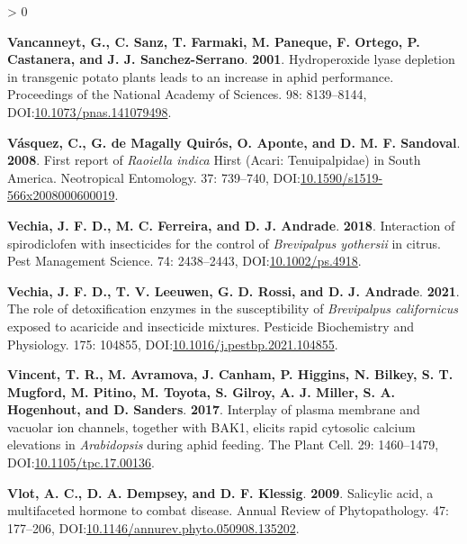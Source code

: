 \documentclass{ufdissertation}[overrideChapters] %
\newlength{\cslhangindent}
\newenvironment{CSLReferences}[2] %
 {%
  \setlength{\parindent}{0pt}
  \ifodd #1 \everypar{\setlength{\hangindent}{\cslhangindent}}\ignorespaces\fi
  \ifnum #2 > 0
  \setlength{\parskip}{#2\baselineskip}
  \fi
 }%
 {}
\begin{document}
{\begin{CSLReferences}{1}{1}
\leavevmode{}%
\textbf{Vancanneyt, G., C. Sanz, T. Farmaki, M. Paneque, F. Ortego, P. Castanera, and J. J. Sanchez-Serrano}. \textbf{2001}. Hydroperoxide lyase depletion in transgenic potato plants leads to an increase in aphid performance. Proceedings of the National Academy of Sciences. 98: 8139--8144, DOI:\href{https://doi.org/10.1073/pnas.141079498}{10.1073/pnas.141079498}.

\leavevmode{}%
\textbf{Vásquez, C., G. de Magally Quirós, O. Aponte, and D. M. F. Sandoval}. \textbf{2008}. First report of {\emph{Raoiella indica}} {Hirst} ({Acari}: {Tenuipalpidae}) in {South} {America}. Neotropical Entomology. 37: 739--740, DOI:\href{https://doi.org/10.1590/s1519-566x2008000600019}{10.1590/s1519-566x2008000600019}.

\leavevmode{}%
\textbf{Vechia, J. F. D., M. C. Ferreira, and D. J. Andrade}. \textbf{2018}. Interaction of spirodiclofen with insecticides for the control of {\emph{Brevipalpus yothersii}} in citrus. Pest Management Science. 74: 2438--2443, DOI:\href{https://doi.org/10.1002/ps.4918}{10.1002/ps.4918}.

\leavevmode{}%
\textbf{Vechia, J. F. D., T. V. Leeuwen, G. D. Rossi, and D. J. Andrade}. \textbf{2021}. The role of detoxification enzymes in the susceptibility of {\emph{Brevipalpus californicus}} exposed to acaricide and insecticide mixtures. Pesticide Biochemistry and Physiology. 175: 104855, DOI:\href{https://doi.org/10.1016/j.pestbp.2021.104855}{10.1016/j.pestbp.2021.104855}.

\leavevmode{}%
\textbf{Vincent, T. R., M. Avramova, J. Canham, P. Higgins, N. Bilkey, S. T. Mugford, M. Pitino, M. Toyota, S. Gilroy, A. J. Miller, S. A. Hogenhout, and D. Sanders}. \textbf{2017}. Interplay of plasma membrane and vacuolar ion channels, together with {BAK}1, elicits rapid cytosolic calcium elevations in {\emph{Arabidopsis}} during aphid feeding. The Plant Cell. 29: 1460--1479, DOI:\href{https://doi.org/10.1105/tpc.17.00136}{10.1105/tpc.17.00136}.

\leavevmode{}%
\textbf{Vlot, A. C., D. A. Dempsey, and D. F. Klessig}. \textbf{2009}. Salicylic acid, a multifaceted hormone to combat disease. Annual Review of Phytopathology. 47: 177--206, DOI:\href{https://doi.org/10.1146/annurev.phyto.050908.135202}{10.1146/annurev.phyto.050908.135202}.


\end{CSLReferences}}
\end{document}
